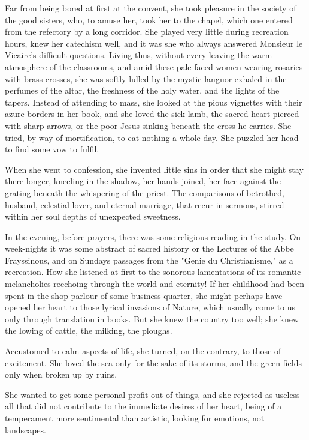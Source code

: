 \documentclass{tufte-book}
\begin{document}
Far from being bored at first at the convent, she took pleasure in the
society of the good sisters, who, to amuse her, took her to the chapel,
which one entered from the refectory by a long corridor. She played very
little during recreation hours, knew her catechism well, and it was she
who always answered Monsieur le Vicaire's difficult questions. Living
thus, without every leaving the warm atmosphere of the classrooms, and
amid these pale-faced women wearing rosaries with brass crosses, she
was softly lulled by the mystic languor exhaled in the perfumes of the
altar, the freshness of the holy water, and the lights of the tapers.
Instead of attending to mass, she looked at the pious vignettes with
their azure borders in her book, and she loved the sick lamb, the sacred
heart pierced with sharp arrows, or the poor Jesus sinking beneath the
cross he carries. She tried, by way of mortification, to eat nothing a
whole day. She puzzled her head to find some vow to fulfil.

When she went to confession, she invented little sins in order that she
might stay there longer, kneeling in the shadow, her hands joined,
her face against the grating beneath the whispering of the priest.
The comparisons of betrothed, husband, celestial lover, and eternal
marriage, that recur in sermons, stirred within her soul depths of
unexpected sweetness.

In the evening, before prayers, there was some religious reading in
the study. On week-nights it was some abstract of sacred history or
the Lectures of the Abbe Frayssinous, and on Sundays passages from the
"Genie du Christianisme," as a recreation. How she listened at first to
the sonorous lamentations of its romantic melancholies reechoing
through the world and eternity! If her childhood had been spent in the
shop-parlour of some business quarter, she might perhaps have opened
her heart to those lyrical invasions of Nature, which usually come to
us only through translation in books. But she knew the country too well;
she knew the lowing of cattle, the milking, the ploughs.

Accustomed to calm aspects of life, she turned, on the contrary, to
those of excitement. She loved the sea only for the sake of its storms,
and the green fields only when broken up by ruins.

She wanted to get some personal profit out of things, and she rejected
as useless all that did not contribute to the immediate desires of her
heart, being of a temperament more sentimental than artistic, looking
for emotions, not landscapes.
\end{document}
